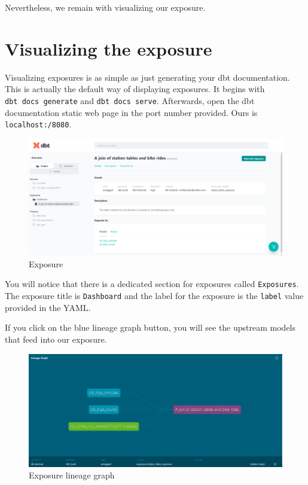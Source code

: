 \documentclass[
]{book}
\begin{document}
Nevertheless, we remain with visualizing our exposure.

\hypertarget{visualizing-the-exposure}{%
\section{Visualizing the exposure}\label{visualizing-the-exposure}}

Visualizing exposures is as simple as just generating your dbt documentation. This is actually the default way of displaying exposures. It begins with \texttt{dbt\ docs\ generate} and \texttt{dbt\ docs\ serve}. Afterwards, open the dbt documentation static web page in the port number provided. Ours is \texttt{localhost:/8080}.

\begin{figure}
\centering
\includegraphics{./images/exposure_webpage.png}
\caption{Exposure}
\end{figure}

You will notice that there is a dedicated section for exposures called \texttt{Exposures}. The exposure title is \texttt{Dashboard} and the label for the exposure is the \texttt{label} value provided in the YAML.

If you click on the blue lineage graph button, you will see the upstream models that feed into our exposure.

\begin{figure}
\centering
\includegraphics{./images/exposure_lineage_graph.png}
\caption{Exposure lineage graph}
\end{figure}
\end{document}
